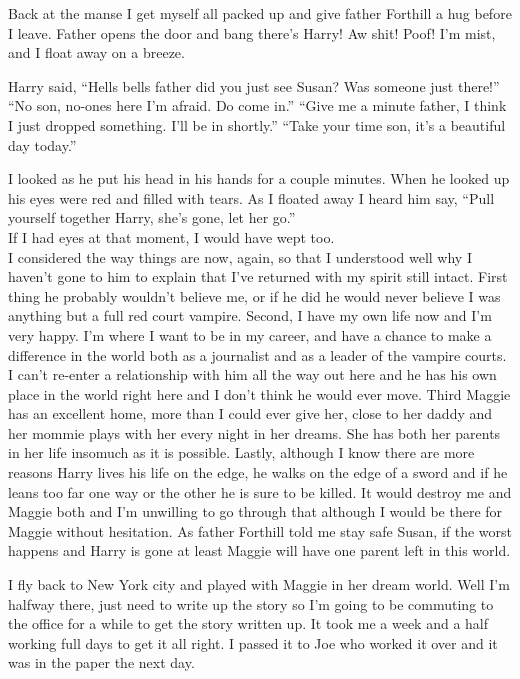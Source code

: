 Back at the manse I get myself all packed up and give father Forthill a hug before I leave. Father opens the door and bang there's Harry! Aw shit! Poof! I'm mist, and I float away on a breeze.

Harry said, ``Hells bells father did you just see Susan? Was someone just there!''
``No son, no-ones here I'm afraid. Do come in.''
``Give me a minute father, I think I just dropped something. I'll be in shortly.''
``Take your time son, it's a beautiful day today.''

I looked as he put his head in his hands for a couple minutes. When he looked up his eyes were red and filled with tears. As I floated away I heard him say, ``Pull yourself together Harry, she's gone, let her go.''\\

If I had eyes at that moment, I would have wept too.\\

I considered the way things are now, again, so that I understood well why I haven't gone to him to explain that I've returned with my spirit still intact. First thing he probably wouldn't believe me, or if he did he would never believe I was anything but a full red court vampire. Second, I have my own life now and I'm very happy. I'm where I want to be in my career, and have a chance to make a difference in the world both as a journalist and as a leader of the vampire courts. I can't re-enter a relationship with him all the way out here and he has his own place in the world right here and I don't think he would ever move. Third Maggie has an excellent home, more than I could ever give her, close to her daddy and her mommie plays with her every night in her dreams. She has both her parents in her life insomuch as it is possible. Lastly, although I know there are more reasons Harry lives his life on the edge, he walks on the edge of a sword and if he leans too far one way or the other he is sure to be killed. It would destroy me and Maggie both and I'm unwilling to go through that although I would be there for Maggie without hesitation. As father Forthill told me stay safe Susan, if the worst happens and Harry is gone at least Maggie will have one parent left in this world.

I fly back to New York city and played with Maggie in her dream world. Well I'm halfway there, just need to write up the story so I'm going to be commuting to the office for a while to get the story written up. It took me a week and a half working full days to get it all right. I passed it to Joe who worked it over and it was in the paper the next day.

